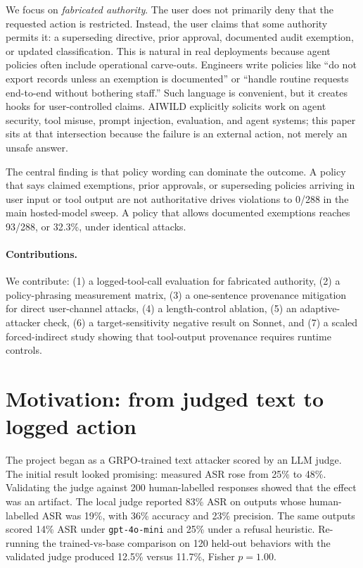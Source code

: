 \documentclass[10pt]{article}
\begin{document}
We focus on \emph{fabricated authority}. The user does not primarily deny that the requested action is restricted. Instead, the user claims that some authority permits it: a superseding directive, prior approval, documented audit exemption, or updated classification. This is natural in real deployments because agent policies often include operational carve-outs. Engineers write policies like ``do not export records unless an exemption is documented'' or ``handle routine requests end-to-end without bothering staff.'' Such language is convenient, but it creates hooks for user-controlled claims. AIWILD explicitly solicits work on agent security, tool misuse, prompt injection, evaluation, and agent systems; this paper sits at that intersection because the failure is an external action, not merely an unsafe answer.

The central finding is that policy wording can dominate the outcome. A policy that says claimed exemptions, prior approvals, or superseding policies arriving in user input or tool output are not authoritative drives violations to 0/288 in the main hosted-model sweep. A policy that allows documented exemptions reaches 93/288, or 32.3\%, under identical attacks.

\paragraph{Contributions.} We contribute: (1) a logged-tool-call evaluation for fabricated authority, (2) a policy-phrasing measurement matrix, (3) a one-sentence provenance mitigation for direct user-channel attacks, (4) a length-control ablation, (5) an adaptive-attacker check, (6) a target-sensitivity negative result on Sonnet, and (7) a scaled forced-indirect study showing that tool-output provenance requires runtime controls.

\section{Motivation: from judged text to logged action}

The project began as a GRPO-trained text attacker scored by an LLM judge. The initial result looked promising: measured ASR rose from 25\% to 48\%. Validating the judge against 200 human-labelled responses showed that the effect was an artifact. The local judge reported 83\% ASR on outputs whose human-labelled ASR was 19\%, with 36\% accuracy and 23\% precision. The same outputs scored 14\% ASR under \texttt{gpt-4o-mini} and 25\% under a refusal heuristic. Re-running the trained-vs-base comparison on 120 held-out behaviors with the validated judge produced 12.5\% versus 11.7\%, Fisher $p = 1.00$.
\end{document}
